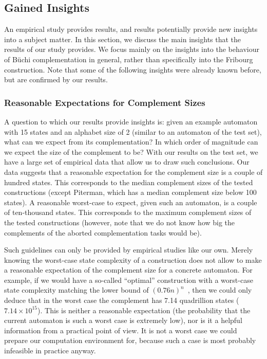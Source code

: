 \subsection{Gained Insights}
\label{5_insights}
An empirical study provides results, and results potentially provide new insights into a subject matter. In this section, we discuss the main insights that the results of our study provides. We focus mainly on the insights into the behaviour of Büchi complementation in general, rather than specifically into the Fribourg construction. Note that some of the following insights were already known before, but are confirmed by our results.


\subsubsection{Reasonable Expectations for Complement Sizes}
A question to which our results provide insights is: given an example automaton with 15 states and an alphabet size of 2 (similar to an automaton of the \goal{} test set), what can we expect from its complementation? In which order of magnitude can we expect the size of the complement to be? With our results on the \goal{} test set, we have a large set of empirical data that allow us to draw such conclusions. Our data suggests that a reasonable expectation for the complement size is a couple of hundred states. This corresponds to the median complement sizes of the tested constructions (except Piterman, which has a median complement size below 100 states). A reasonable worst-case to expect, given such an automaton, is a couple of ten-thousand states. This corresponds to the maximum complement sizes of the tested constructions (however, note that we do not know how big the complements of the aborted complementation tasks would be).

Such guidelines can only be provided by empirical studies like our own. Merely knowing the worst-case state complexity of a construction does not allow to make a reasonable expectation of the complement size for a concrete automaton. For example, if we would have a so-called ``optimal'' construction with a worst-case state complexity matching the lower bound of $(0.76n)^n$~\cite{DBLP:journals/corr/abs-0802-1226}, then we could only deduce that in the worst case the complement has 7.14 quadrillion states ($7.14 \times 10^{15}$). This is neither a reasonable expectation (the probability that the current automaton is such a worst case is extremely low), nor is it a helpful information from a practical point of view. It is not a worst case we could prepare our computation environment for, because such a case is most probably infeasible in practice anyway.  

